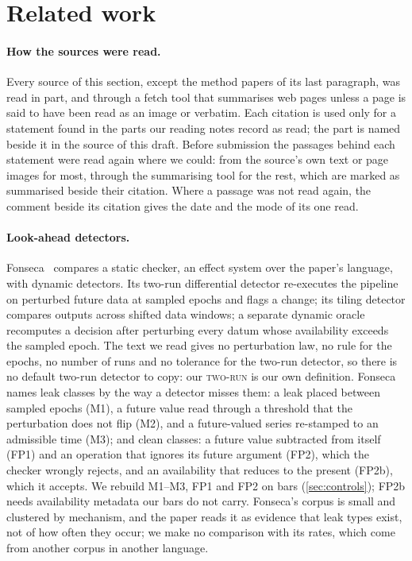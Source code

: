 \documentclass[11pt]{article}
\newcommand{\TR}{\textsc{two-run}}
\begin{document}
\section{Related work}\label{sec:related}

\paragraph{How the sources were read.} Every source of this section, except the method papers of its last paragraph, was read in part, and through a fetch
tool that summarises web pages unless a page is said to have been read as an image or verbatim.
Each citation is used only for a statement found in the parts our reading notes record as read;
the part is named beside it in the source of this draft. Before submission the passages behind
each statement were read again where we could: from the source's own text or page images for most,
through the summarising tool for the rest, which are marked as summarised beside their citation.
Where a passage was not read again, the comment beside its citation gives the date and the mode of
its one read.

\paragraph{Look-ahead detectors.}
Fonseca~\cite{fonseca2026} %
compares a static checker, an effect system over the paper's language, with dynamic detectors.
Its two-run differential detector re-executes the pipeline on perturbed future data at sampled
epochs and flags a change; its tiling detector compares outputs across shifted data windows; a
separate dynamic oracle recomputes a decision after perturbing every datum whose availability
exceeds the sampled epoch. %
The text we read gives no perturbation law, no rule for the epochs, no number of runs and no
tolerance for the two-run detector, %
so there is no default two-run detector to copy: our \TR{} is our own definition. Fonseca names
leak classes by the way a detector misses them: a leak placed between sampled epochs (M1), a future
value read through a threshold that the perturbation does not flip (M2), and a future-valued
series re-stamped to an admissible time (M3); and clean classes: a future value subtracted from
itself (FP1) and an operation that ignores its future argument (FP2), which the checker wrongly
rejects, and an availability that reduces to the present (FP2b), which it accepts. %
We rebuild M1--M3, FP1 and FP2 on bars (\cref{sec:controls}); FP2b needs availability metadata
our bars do not carry. Fonseca's corpus is small and clustered by mechanism, and the paper reads it as
evidence that leak types exist, not of how often they occur; %
we make no comparison with its rates, which come from another corpus in another language.
\end{document}
